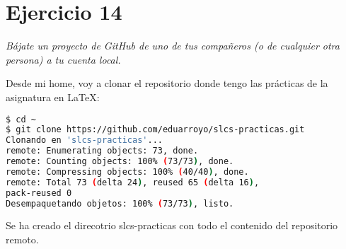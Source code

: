 \section{Ejercicio 14}
\begin{center}
    \parbox{12cm}{\justify\textit{
        Bájate un proyecto de GitHub de uno de tus compañeros (o de cualquier otra  persona) a tu cuenta local.
    }}
\end{center}

Desde mi home, voy a clonar el repositorio donde tengo las prácticas de la asignatura en \LaTeX :
\begin{lstlisting}[xleftmargin=.16\textwidth,language=bash]
$ cd ~ 
$ git clone https://github.com/eduarroyo/slcs-practicas.git
Clonando en 'slcs-practicas'...
remote: Enumerating objects: 73, done.
remote: Counting objects: 100% (73/73), done.
remote: Compressing objects: 100% (40/40), done.
remote: Total 73 (delta 24), reused 65 (delta 16),
pack-reused 0
Desempaquetando objetos: 100% (73/73), listo.
\end{lstlisting}
Se ha creado el direcotrio slcs-practicas con todo el contenido del repositorio remoto.